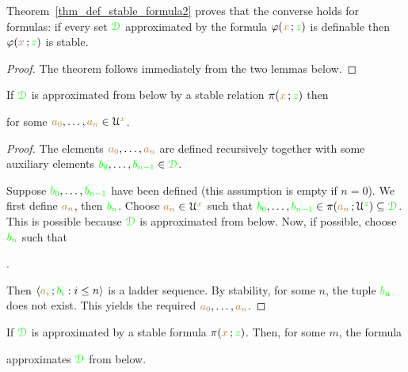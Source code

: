 Theorem~\ref{thm_def_stable_formula2} proves that the converse holds for formulas: if every set ${\color{green}\EuScript D}$ approximated by the formula $\varphi({\color{brown} x}\,;{\color{green} z})$ is definable then $\varphi({\color{brown} x}\,;{\color{green} z})$ is stable.

\begin{proof}
  The theorem follows immediately from the two lemmas below.
\end{proof}

\begin{lemma}
If ${\color{green}\EuScript D}$ is approximated from below by a stable relation $\pi({\color{brown} x}\,;{\color{green} z})$ then


for some ${\color{brown} a_0},\dots,{\color{brown} a_n}\in\EuScript U^{\color{brown} x}$.
\end{lemma}

\begin{proof}
The elements ${\color{brown} a_0},\dots,{\color{brown} a_n}$ are defined recursively together with some auxiliary elements ${\color{green} b_0},\dots,{\color{green} b_{n-1}}\in{\color{green}\EuScript D}$.

Suppose ${\color{green} b_0},\dots,{\color{green} b_{n-1}}$ have been defined (this assumption is empty if $n=0$).
We first define ${\color{brown} a_n}$, then ${\color{green} b_n}$.
Choose ${\color{brown} a_n}\in\EuScript U^{\color{brown} x}$ such that ${\color{green} b_0},\dots,{\color{green} b_{n-1}}\in\pi({\color{brown} a_n}\,;\EuScript U^{\color{green} z})\subseteq{\color{green}\EuScript D}$.
This is possible because ${\color{green}\EuScript D}$ is approximated from below.
Now, if possible, choose ${\color{green} b_n}$ such that

.

Then $\langle{\color{brown}a_i}\,;{\color{green} b_i} : i\le n\rangle$ is a ladder sequence.
By stability, for some $n$, the tuple ${\color{green} b_n}$ does not exist.
This yields the required ${\color{brown} a_0},\dots,{\color{brown} a_n}$.
\end{proof}

\begin{lemma}\label{lem_stab_approx_below}
If ${\color{green}\EuScript D}$ is approximated by a stable formula $\pi({\color{brown} x}\,;{\color{green} z})$.
Then, for some $m$, the formula


approximates ${\color{green}\EuScript D}$ from below.
\end{lemma}

